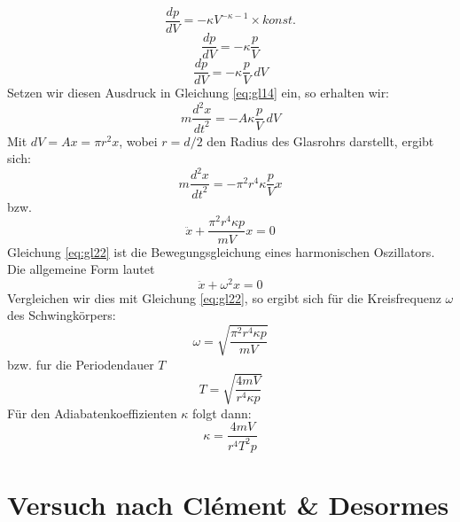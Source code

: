 \documentclass[a4paper,10pt]{article}
\begin{document}
\begin{equation}
\frac{dp}{dV} = - \kappa V^{-\kappa -1 } \times konst.
\end{equation}
\begin{equation}
\frac{dp}{dV} = - \kappa \frac{p}{V}
\end{equation}
\begin{equation}
\frac{dp}{dV} = - \kappa \frac{p}{V}\: dV
\end{equation}
Setzen wir diesen Ausdruck in Gleichung \eqref{eq:gl14} ein, so erhalten wir:
\begin{equation}
 m \frac{{d^2}x}{{dt}^2}= - A \kappa \frac{p}{V}\:{dV}
\end{equation}
Mit \(dV = Ax = \pi r^2 x\), wobei \(r=d/2\) den Radius des Glasrohrs darstellt, ergibt sich:
\begin{equation}
 m \frac{{d^2}x}{{dt}^2}= - \pi^2 r^4\kappa \frac{p}{V} x
\end{equation}
bzw.
\begin{equation} \label{eq:gl22}
 \ddot{x} + \frac{\pi^2 r^4 \kappa p}{mV} x = 0
\end{equation}
Gleichung \eqref{eq:gl22} ist die Bewegungsgleichung eines harmonischen Oszillators. Die
allgemeine Form lautet
\begin{equation} 
 \ddot{x} + \omega^2 x = 0
\end{equation}
Vergleichen wir dies mit Gleichung \eqref{eq:gl22}, so ergibt sich für die Kreisfrequenz \(\omega\) des Schwingkörpers:
\begin{equation} 
 \omega = \sqrt{\frac{\pi^2 r^4 \kappa p}{mV}}
\end{equation}
bzw. fur die Periodendauer \(T\)
\begin{equation} 
 T = \sqrt{\frac{4mV}{ r^4 \kappa p}}
\end{equation}
Für den Adiabatenkoeffizienten \(\kappa \) folgt dann:
\begin{equation} \label{eq:kappa_2}
\boxed{\kappa = \frac{4 m V}{r^4 T^2 p}}
\end{equation}

\section{ Versuch nach Clément \& Desormes}
\end{document}
